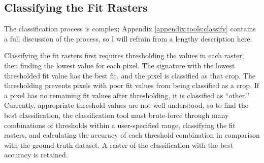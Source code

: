\subsection{Classifying the Fit Rasters}

The classification process is complex; Appendix \ref{appendix:tools:classify} contains a full discussion of the process, so I will refrain from a lengthy description here.

Classifying the fit rasters first requires thresholding the values in each raster, then finding the lowest value for each pixel. The signature with the lowest thresholded fit value has the best fit, and the pixel is classified as that crop. The thresholding prevents pixels with poor fit values from being classified as a crop. If a pixel has no remaining fit values after thresholding, it is classified as ``other.'' Currently, appropriate threshold values are not well understood, so to find the best classification, the classification tool must brute-force through many combinations of thresholds within a user-specified range, classifying the fit rasters, and calculating the accuracy of each threshold combination in comparison with the ground truth dataset. A raster of the classification with the best accuracy is retained.
























